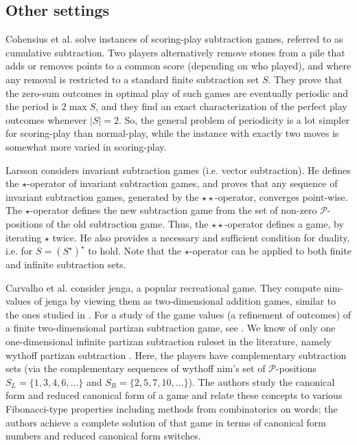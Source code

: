 \documentclass{amsart}
\theoremstyle{plain}
\theoremstyle{definition}
\renewcommand{\P}{\ensuremath{\mathcal P}}
\begin{document}
\subsection{Other settings} 
Cohensius et al. \cite{cohensius2019cumulative}  solve instances of scoring-play  subtraction games, referred to as {\sc cumulative subtraction}. Two players alternatively remove stones from a pile that adds or removes points to a common score (depending on who played), and where any removal is restricted to a standard finite subtraction set $S$. They prove that the zero-sum outcomes in optimal play of such games are eventually periodic and the period is $2\max S$, and they find an exact characterization of the perfect play outcomes whenever $|S|=2$. So, the general problem of periodicity is a lot simpler for scoring-play than normal-play, while the instance with exactly two moves is somewhat more varied in scoring-play.

Larsson  \cite{larsson2012operator} considers   invariant subtraction games (i.e. {\sc vector subtraction}). %
He defines the $\star$-operator of invariant subtraction games, and proves that any sequence of invariant subtraction games, generated by the  $\star\star$-operator, converges point-wise. The $\star$-operator defines the new subtraction game from the set of non-zero \P-positions of the old subtraction game. Thus, the $\star\star$-operator defines a game, by iterating $\star$ twice. He also provides a necessary and sufficient condition for duality, i.e. for $S= (S^{\star})^{\star}$ to hold. Note that the $\star$-operator can be applied to both finite and infinite subtraction sets. 

Carvalho et al. \cite{carvalho2020combinatorics} consider {\sc jenga}, a  popular recreational game. They compute nim-values of {\sc jenga} by viewing them as two-dimensional addition games, similar to the ones studied in \cite{larsson2013heaps}. For a study of the game values (a refinement of outcomes) of a finite two-dimensional partizan subtraction game, see  \cite{carvalho2012recursive}. We know of only one one-dimensional infinite partizan subtraction ruleset in the literature, namely  {\sc wythoff partizan subtraction} \cite{LarssonUrbanNeil}. Here, the players have complementary subtraction sets (via the complementary sequences of {\sc wythoff nim}'s set of \P-positions $S_L=\{1,3,4,6,\ldots\}$ and $S_R=\{2,5,7,10,\ldots \}$). The authors study the canonical form and reduced canonical form of a game  \cite{siegel2013combinatorial} and relate these concepts to various Fibonacci-type properties including methods from combinatorics on words; the authors achieve a complete solution of that game in terms of canonical form numbers and reduced canonical form switches. 
\end{document}
